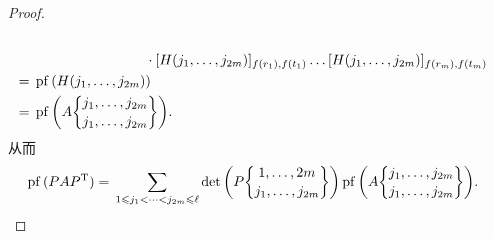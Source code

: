 \documentclass[../libro.tex]{subfiles}
\begin{document}
\begin{proof}
\begin{align*}
        \\
        &
        \quad \quad \quad \quad \quad \quad \quad \quad
        \cdot
        [H(j_1, \dots, j_{2m})]_{f(r_1),f(t_1)}
        \dots
        [H(j_1, \dots, j_{2m})]_{f(r_m),f(t_m)}
        \\
        = {} &
        \operatorname{pf} {(H(j_1, \dots, j_{2m}))}
        \\
        = {} &
        \operatorname{pf} {\left(
                A\submat{j_1,\dots,j_{2m}}{j_1,\dots,j_{2m}}
        \right)}.
    \end{align*}
    从而
    \begin{align*}
        \operatorname{pf} {(P A P^{\mathrm{T}})}
        = {} &
        \sum_{1 \leq j_1 < \dots < j_{2m} \leq \ell}
        {\det {\left(
                    P\submat{1,\dots,2m}{j_1,\dots,j_{2m}}
            \right)}
            \operatorname{pf} {\left(
                    A\submat{j_1,\dots,j_{2m}}{j_1,\dots,j_{2m}}
        \right)}}.
    \end{align*}
\end{proof}

\clearpage

\TheoremPfaffianSquaredIsDet*
\end{document}
